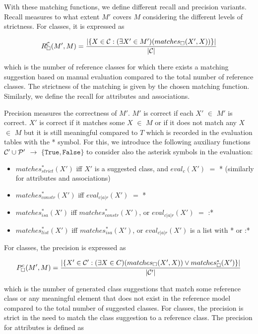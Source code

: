 With these matching functions, we define different recall and precision variants.
Recall measures to what extent $M'$ covers $M$ considering the different levels of strictness.
For classes, it is expressed as


\[R^{\cal C}_\Box(M',M) = \frac{\vert \{X \in {\cal C}: (\exists X' \in M')(matches_\Box(X',X))\} \vert}{\vert {\cal C} \vert}\]

\noindent which is the number of reference classes for which there exists a matching suggestion based on manual evaluation compared to the total number of reference classes.
The strictness of the matching is given by the chosen matching function.
Similarly, we define the recall for attributes and associations.

Precision measures the correctness of $M'$.
$M'$ is correct if each $X'$ $\in$ $M'$ is correct.
$X'$ is correct if it matches some $X$ $\in$ $M$ or if it does not match any $X$ $\in$ $M$ but it is still meaningful compared to $T$ which is recorded in the evaluation tables with the * symbol.
For this, we introduce the following auxiliary functions ${\cal C}' \cup {\cal P}'$ $\rightarrow$ $\{\mathtt{True}, \mathtt{False}\}$ to consider also the asterisk symbols in the evaluation:
\begin{itemize}
    \item $matches^*_{strict}(X')$ iff $X'$ is a suggested class, and $eval_c(X')$ $=$ * (similarly for attributes and associations)
    \item $matches^*_{constr}(X')$ iff $eval_{c \vert a \vert r}(X')$ $=$ *
    \item $matches^*_{isa}(X')$ iff $matches^*_{constr}(X')$, or $eval_{c \vert a \vert r}(X')$ $=$ :*
    \item $matches^*_{list}(X')$ iff $matches^*_{isa}(X')$, or $eval_{c \vert a \vert r}(X')$ is a list with * or :*
\end{itemize}

For classes, the precision is expressed as

\[P^c_\Box(M',M) = \frac{\vert \{X' \in {\cal C}': (\exists X \in C)(matches_\Box(X',X)) \lor matches^*_\Box(X') \}\vert}{\vert {\cal C'} \vert}\]

\noindent which is the number of generated class suggestions that match some reference class or any meaningful element that does not exist in the reference model compared to the total number of suggested classes.
For classes, the precision is strict in the need to match the class suggestion to a reference class.
The precision for attributes is defined as

